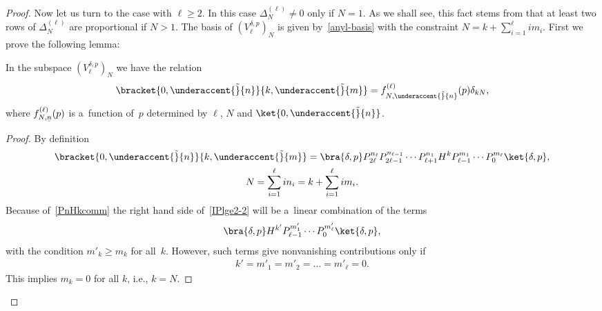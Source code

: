 \documentclass[pdftex]{sigma}
\numberwithin{equation}{section}
\begin{document}
\begin{proof}
Now let us turn to the case with $\ell \geq 2$.
In this case $ \Delta^{(\ell)}_N \neq 0 $ only if $N = 1$.
As we shall see, this fact stems from that at least two rows of $ \Delta^{(\ell)}_N $ are proportional if $ N > 1$.
The basis of $(V^{\delta,p}_{\ell})_N $ is given by~\eqref{anyl-basis} with the constraint $  N = k+
\sum\limits_{i=1}^{\ell} i   m_i$.
First we prove the following lemma:
\begin{lemma}
\label{lemma2}
In the subspace $ (V^{\delta,p}_{\ell})_N $ we have the relation
\begin{gather*}
\bracket{0,\underaccent{\tilde}{n}}{k,\underaccent{\tilde}{m}} = f^{(\ell)}_{N,\underaccent{\tilde}{n}}(p) \delta_{kN},
\end{gather*}
where $ f^{(\ell)}_{N,\underaccent{\tilde}{n}}(p) $ is a~function of~$p$ determined by $ \ell$, $N $ and $
\ket{0,\underaccent{\tilde}{n}}$.
\end{lemma}
\begin{proof}
By def\/inition
\begin{gather}
    \bracket{0,\underaccent{\tilde}{n}}{k,\underaccent{\tilde}{m}} = \bra{\delta,p} P_{2\ell}^{n_{\ell}}
P_{2\ell-1}^{n_{\ell-1}} \cdots P_{\ell+1}^{n_1} H^k P_{\ell-1}^{m_1} \cdots P_0^{m_{\ell}} \ket{\delta,p},
\label{IPlge2-2}
\\
    N = \sum\limits_{i=1}^{\ell} i n_i = k + \sum\limits_{i=1}^{\ell} i  m_i.
\nonumber
\end{gather}
Because of~\eqref{PnHkcomm} the right hand side of~\eqref{IPlge2-2} will be a~linear combination of the terms
\begin{gather*}
\bra{\delta,p} H^{k'} P_{\ell-1}^{m'_1} \cdots P_0^{m'_{\ell}} \ket{\delta,p},
\end{gather*}
with the condition $ m'_k \geq m_k $ for all~$k$.
However, such terms give nonvanishing contributions only if
\begin{gather*}
k' = m'_1 = m'_2 = \dots = m'_{\ell} = 0.
\end{gather*}
This implies $ m_k = 0 $ for all $k$, i.e., $ k = N$.
\end{proof}


\end{proof}
\end{document}
